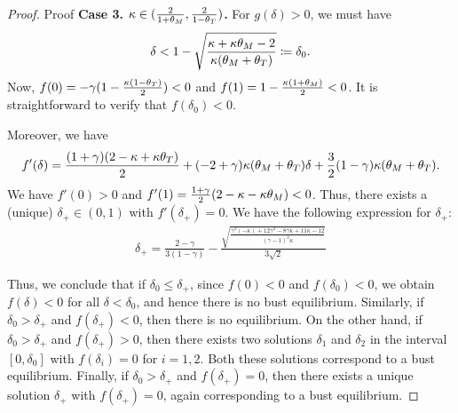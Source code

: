 \begin{proof}{Proof}
\textbf{Case 3. $\kappa \in (\frac{2}{1+\tm}, \frac{2}{1-\tt})$.} For $g(\delta) > 0$, we must have  
\begin{align*}
    \delta  < 1 - \sqrt{\frac{\kappa + \kappa \tm -2 }{\kappa (\tm + \tt)}} \defeq \delta_0.
\end{align*}
Now, $f(0) = -\gamma ( 1 -\frac{\kappa (1-\tt)}{2} ) < 0$  and $f(1) = 1 -\frac{\kappa (1+\tm)}{2} < 0$. It is straightforward to verify that $f(\delta_0) < 0$.


Moreover, we have
\begin{align*}
    f'(\delta) = \frac{(1+\gamma)(2-\kappa + \kappa \tt)}{2} + (-2+\gamma) \kappa ( \tm + \tt) \delta + \frac{3}{2}  (1-\gamma) \kappa (\tm + \tt).
\end{align*}
We have $f'(0) > 0$ and $f'(1) = \frac{1+\gamma}{2} (2 - \kappa - \kappa \tm ) < 0$. Thus, there exists a (unique) $\delta_+ \in (0,1)$ with $f'(\delta_+) = 0$. We have the following expression for $\delta_+$:
\begin{align*}
    \delta_+ = \frac{2-\gamma}{3(1-\gamma)} - \frac{\sqrt{\frac{\gamma^2 (-\kappa)+12 \gamma^2-8 \gamma \kappa+11 \kappa-12}{(\gamma-1)^2 \kappa}}}{3 \sqrt{2}}
\end{align*}

Thus, we conclude that if $\delta_0 \leq \delta_+$, since $f(0) < 0$ and $f(\delta_0) <0$, we obtain $f(\delta) < 0$ for all $\delta < \delta_0$, and hence there is no bust equilibrium. Similarly, if $\delta_0 > \delta_+$ and $f(\delta_+) < 0$, then there is no equilibrium. On the other hand, if $\delta_0 > \delta_+$ and $f(\delta_+) > 0$, then there exists two solutions $\delta_1$ and $\delta_2$ in the interval $[0, \delta_0]$ with $f(\delta_i) = 0$ for $i =1,2$. Both these solutions correspond to a bust equilibrium. Finally, if $\delta_0 > \delta_+$ and $f(\delta_+) = 0$, then there exists a unique solution $\delta_+$ with $f(\delta_+) = 0$, again corresponding to a bust equilibrium.


\end{proof}
